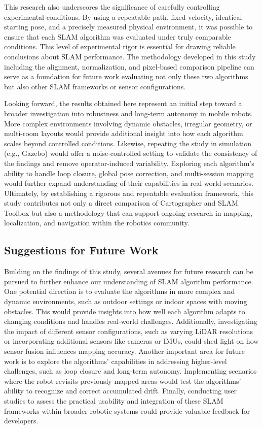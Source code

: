 \documentclass[runningheads,11pt]{llncs_bigfont_absbib}
\begin{document}
This research also underscores the significance of carefully controlling experimental conditions.
By using a repeatable path, fixed velocity, identical starting pose, and a precisely measured
physical environment, it was possible to ensure that each SLAM algorithm was evaluated under
truly comparable conditions. This level of experimental rigor is essential for drawing reliable
conclusions about SLAM performance. The methodology developed in this study including the
alignment, normalization, and pixel-based comparison pipeline can serve as a foundation for
future work evaluating not only these two algorithms but also other SLAM frameworks or sensor
configurations.

Looking forward, the results obtained here represent an initial step toward a broader investigation
into robustness and long-term autonomy in mobile robots. More complex environments involving
dynamic obstacles, irregular geometry, or multi-room layouts would provide additional insight into
how each algorithm scales beyond controlled conditions. Likewise, repeating the study in simulation
(e.g., Gazebo) would offer a noise-controlled setting to validate the consistency of the findings and
remove operator-induced variability. Exploring each algorithm's ability to handle loop closure,
global pose correction, and multi-session mapping would further expand understanding of their
capabilities in real-world scenarios. Ultimately, by establishing a rigorous and repeatable evaluation
framework, this study contributes not only a direct comparison of Cartographer and SLAM Toolbox
but also a methodology that can support ongoing research in mapping, localization, and navigation
within the robotics community.

\subsection{Suggestions for Future Work}
Building on the findings of this study, several avenues for future research can be pursued to further enhance our understanding of SLAM algorithm performance. One potential direction is to evaluate the algorithms in more complex and dynamic environments, such as outdoor settings or indoor spaces with moving obstacles. This would provide insights into how well each algorithm adapts to changing conditions and handles real-world challenges. Additionally, investigating the impact of different sensor configurations, such as varying LiDAR resolutions or incorporating additional sensors like cameras or IMUs, could shed light on how sensor fusion influences mapping accuracy. Another important area for future work is to explore the algorithms' capabilities in addressing higher-level challenges, such as loop closure and long-term autonomy. Implementing scenarios where the robot revisits previously mapped areas would test the algorithms' ability to recognize and correct accumulated drift. Finally, conducting user studies to assess the practical usability and integration of these SLAM frameworks within broader robotic systems could provide valuable feedback for developers.
\end{document}
